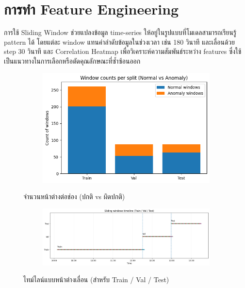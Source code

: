 \section{การทำ Feature Engineering}
การใช้ Sliding Window ช่วยแปลงข้อมูล time-series ให้อยู่ในรูปแบบที่โมเดลสามารถเรียนรู้ pattern ได้ โดยแต่ละ window แทนค่าลำดับข้อมูลในช่วงเวลา เช่น 180 วินาที และเลื่อนด้วย step 30 วินาที และ Correlation Heatmap เพื่อวิเคราะห์ความสัมพันธ์ระหว่าง features ซึ่งใช้เป็นแนวทางในการเลือกหรือตัดคุณลักษณะที่ซ้ำซ้อนออก

\begin{figure}[ht]
\begin{center}
      \begin{subfigure}[b]{0.9\textwidth}
            \includegraphics[width=\textwidth]{Image/window count.png}
      \end{subfigure}
          \caption[จำนวนหน้าต่างต่อช่อง (ปกติ vs ผิดปกติ)]{จำนวนหน้าต่างต่อช่อง (ปกติ vs ผิดปกติ)}
  
      \vspace{2mm}
      \begin{subfigure}[b]{\textwidth}
          \includegraphics[width=\textwidth]{Image/slide window1.png}
      \end{subfigure}
          \caption[ไทม์ไลน์แบบหน้าต่างเลื่อน]{ไทม์ไลน์แบบหน้าต่างเลื่อน (สำหรับ Train / Val / Test)}
\end{center}
\end{figure}

